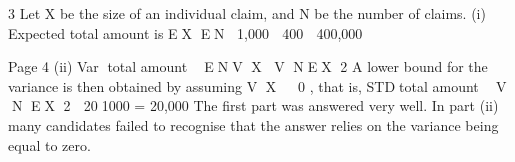 \documentclass[a4paper,12pt]{article}
\begin{document}
3 Let X be the size of an individual claim, and N be the number of claims.
(i) Expected total amount is EX EN 1,000  400  400,000

Page 4
(ii) Var total amount  ENV X V NEX 2
A lower bound for the variance is then obtained by assuming V X   0 , that
is,
STDtotal amount  V N EX 2  201000 = 20,000
The first part was answered very well. In part (ii) many candidates failed to recognise that
the answer relies on the variance being equal to zero.
\end{document}
